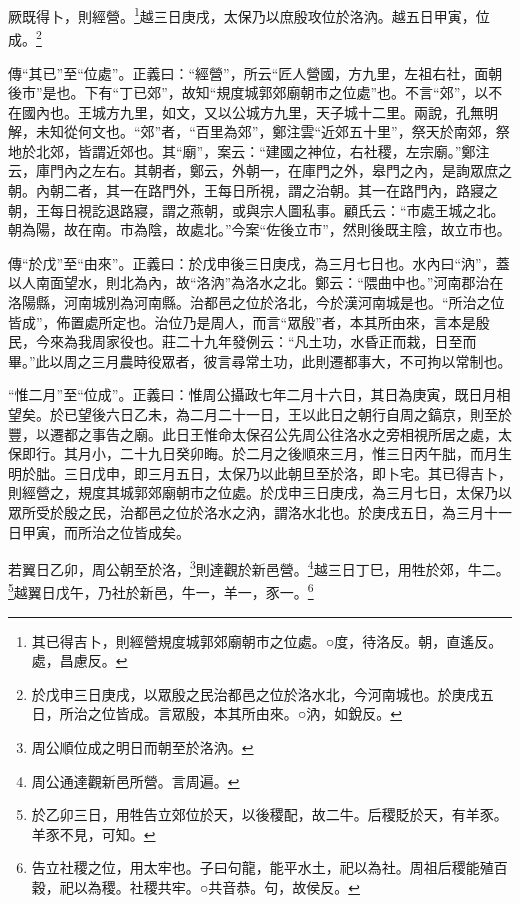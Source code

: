 厥既得卜，則經營。\footnote{其已得吉卜，則經營規度城郭郊廟朝市之位處。○度，待洛反。朝，直遙反。處，昌慮反。}越三日庚戌，太保乃以庶殷攻位於洛汭。越五日甲寅，位成。\footnote{於戊申三日庚戌，以眾殷之民治都邑之位於洛水北，今河南城也。於庚戌五日，所治之位皆成。言眾殷，本其所由來。○汭，如銳反。}

{\noindent\zhuan{}\fzbyks 傳“其已”至“位處”。正義曰：“經營”，所云“匠人營國，方九里，左祖右社，面朝後市”是也。下有“丁已郊”，故知“規度城郭郊廟朝市之位處”也。不言“郊”，以不在國內也。王城方九里，如文，又以公城方九里，天子城十二里。兩說，孔無明解，未知從何文也。“郊”者，“百里為郊”，鄭注雲“近郊五十里”，祭天於南郊，祭地於北郊，皆謂近郊也。其“廟”，案云：“建國之神位，右社稷，左宗廟。”鄭注云，庫門內之左右。其朝者，鄭云，外朝一，在庫門之外，皋門之內，是詢眾庶之朝。內朝二者，其一在路門外，王每日所視，謂之治朝。其一在路門內，路寢之朝，王每日視訖退路寢，謂之燕朝，或與宗人圖私事。顧氏云：“市處王城之北。朝為陽，故在南。市為陰，故處北。”今案“佐後立市”，然則後既主陰，故立市也。 \par}

{\noindent\zhuan{}\fzbyks 傳“於戊”至“由來”。正義曰：於戊申後三日庚戌，為三月七日也。水內曰“汭”，蓋以人南面望水，則北為內，故“洛汭”為洛水之北。鄭云：“隈曲中也。”河南郡治在洛陽縣，河南城別為河南縣。治都邑之位於洛北，今於漢河南城是也。“所治之位皆成”，佈置處所定也。治位乃是周人，而言“眾殷”者，本其所由來，言本是殷民，今來為我周家役也。莊二十九年發例云：“凡土功，水昏正而栽，日至而畢。”此以周之三月農時役眾者，彼言尋常土功，此則遷都事大，不可拘以常制也。 \par}

{\noindent\shu{}\fzkt “惟二月”至“位成”。正義曰：惟周公攝政七年二月十六日，其日為庚寅，既日月相望矣。於已望後六日乙未，為二月二十一日，王以此日之朝行自周之鎬京，則至於豐，以遷都之事告之廟。此日王惟命太保召公先周公往洛水之旁相視所居之處，太保即行。其月小，二十九日癸卯晦。於二月之後順來三月，惟三日丙午朏，而月生明於朏。三日戊申，即三月五日，太保乃以此朝旦至於洛，即卜宅。其已得吉卜，則經營之，規度其城郭郊廟朝市之位處。於戊申三日庚戌，為三月七日，太保乃以眾所受於殷之民，治都邑之位於洛水之汭，謂洛水北也。於庚戌五日，為三月十一日甲寅，而所治之位皆成矣。 \par}

若翼日乙卯，周公朝至於洛，\footnote{周公順位成之明日而朝至於洛汭。}則達觀於新邑營。\footnote{周公通達觀新邑所營。言周遍。}越三日丁巳，用牲於郊，牛二。\footnote{於乙卯三日，用牲告立郊位於天，以後稷配，故二牛。后稷貶於天，有羊豕。羊豕不見，可知。}越翼日戊午，乃社於新邑，牛一，羊一，豕一。\footnote{告立社稷之位，用太牢也。子曰句龍，能平水土，祀以為社。周祖后稷能殖百穀，祀以為稷。社稷共牢。○共音恭。句，故侯反。}


